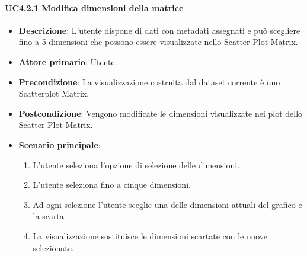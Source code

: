 \paragraph{UC4.2.1 Modifica dimensioni della matrice}
\label{par:uc4.2.1}
\begin{itemize}
    \item \textbf{Descrizione}:     L’utente dispone di dati con metadati assegnati e può 
                                    scegliere fino a 5 dimensioni che possono essere visualizzate nello Scatter Plot 
                                    Matrix.
	
    \item \textbf{Attore primario}: Utente.
    
    \item \textbf{Precondizione}:   La visualizzazione costruita dal dataset corrente è uno Scatterplot Matrix.
    \item \textbf{Postcondizione}:  Vengono modificate le dimensioni visualizzate nei plot dello Scatter Plot Matrix.

	\item \textbf{Scenario principale}:
        \begin{enumerate}
            \item   L'utente seleziona l'opzione di selezione delle dimensioni.
            \item   L'utente seleziona fino a cinque dimensioni. 
           
            \item   Ad ogni selezione l'utente
                    sceglie una delle dimensioni attuali del grafico e la scarta.
           
            \item   La visualizzazione sostituisce le dimensioni scartate con le nuove selezionate.
        \end{enumerate}
\end{itemize}

